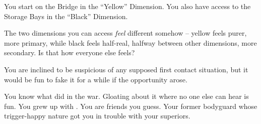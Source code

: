 \documentclass[char]{TMFHope}
\begin{document}
\begin{itemz}[Notes]
	\item You start on the Bridge in the ``Yellow'' Dimension. You also have access to the Storage Bays in the ``Black'' Dimension. 
	\item The two dimensions you can access {\em feel} different somehow -- yellow feels purer, more primary, while black feels half-real, halfway between other dimensions, more secondary.  Is that how everyone else feels?
	\item You are inclined to be suspicious of any supposed first contact situation, but it would be fun to fake it for a while if the opportunity arose.
\end{itemz}

\begin{contacts}
	\contact{\cXO{}} You know what \cXO{\they} did in the war. Gloating about it where no one else can hear is fun.
	\contact{\cMed{}} You grew up with \cMed{\them}. You are friends you guess.
	\contact{\cWeap{}} Your former bodyguard whose trigger-happy nature got you in trouble with your superiors.
\end{contacts}
\end{document}

